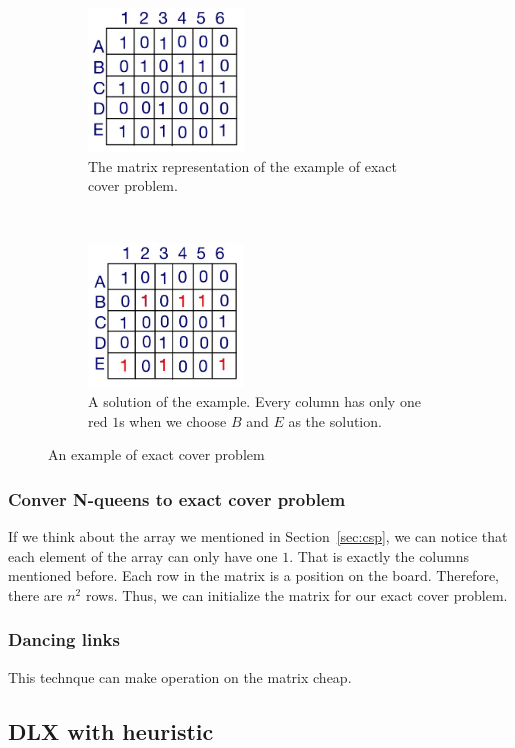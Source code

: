 \begin{figure}[ht]
  \centering
  \begin{subfigure}[t]{0.5\textwidth}
    \includegraphics[height=1.5in]{figure/ecp_1.JPG}
    \caption{The matrix representation of the example of exact cover problem.}
    \label{fig:ecp_1}
  \end{subfigure}%
  ~  
  \begin{subfigure}[t]{0.5\textwidth}
    \includegraphics[height=1.5in]{figure/ecp_2.JPG}
    \caption{A solution of the example. Every column has only one red $1$s when we choose $B$ and $E$ as the solution. }
    \label{fig:ecp_2}
  \end{subfigure}%
  \caption{An example of exact cover problem}
  \label{fig:ecp}
\end{figure}

\subsubsection{Conver N-queens to exact cover problem}
If we think about the array we mentioned in Section~\ref{sec:csp}, we can notice that each element of the array can only have one $1$. That is exactly the columns mentioned before. Each row in the matrix is a position on the board. Therefore, there are $n^2$ rows. Thus, we can initialize the matrix for our exact cover problem.

\subsubsection{Dancing links}
This technque can make operation on the matrix cheap. 

\subsection{DLX with heuristic}


